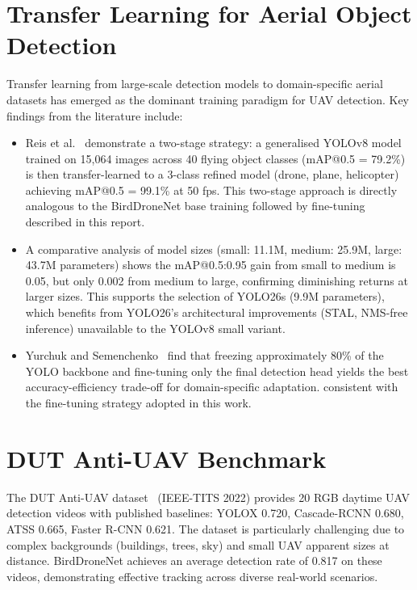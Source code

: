 \documentclass[12pt,a4paper]{report}
\begin{document}
\section{Transfer Learning for Aerial Object Detection}

Transfer learning from large-scale detection models to domain-specific
aerial datasets has emerged as the dominant training paradigm for UAV
detection. Key findings from the literature include:

\begin{itemize}
  \item Reis et al.~\cite{reis2024yolov8} demonstrate a two-stage strategy: a generalised YOLOv8
        model trained on 15,064 images across 40 flying object classes (mAP@0.5 = 79.2\%) is then
        transfer-learned to a 3-class refined model (drone, plane, helicopter) achieving
        mAP@0.5 = 99.1\% at 50 fps. This two-stage approach is directly analogous to the
        BirdDroneNet base training followed by fine-tuning described in this report.
  \item A comparative analysis of model sizes (small: 11.1M, medium: 25.9M, large: 43.7M parameters)
        shows the mAP@0.5:0.95 gain from small to medium is 0.05, but only 0.002 from medium to large,
        confirming diminishing returns at larger sizes. This supports the selection of YOLO26s (9.9M
        parameters), which benefits from YOLO26's architectural improvements (STAL, NMS-free inference)
        unavailable to the YOLOv8 small variant.
  \item Yurchuk and Semenchenko~\cite{yurchuk2024edge} find that freezing approximately 80\% of the
        YOLO backbone and fine-tuning only the final detection head yields the best accuracy-efficiency
        trade-off for domain-specific adaptation. consistent with the fine-tuning strategy adopted
        in this work.
\end{itemize}

\section{DUT Anti-UAV Benchmark}

The DUT Anti-UAV dataset~\cite{dutantiuav2022} (IEEE-TITS 2022) provides
20 RGB daytime UAV detection videos with published baselines:
YOLOX 0.720, Cascade-RCNN 0.680, ATSS 0.665, Faster R-CNN 0.621.
The dataset is particularly challenging due to complex backgrounds
(buildings, trees, sky) and small UAV apparent sizes at distance.
BirdDroneNet achieves an average detection rate of 0.817 on these
videos, demonstrating effective tracking across diverse real-world scenarios.
\end{document}
